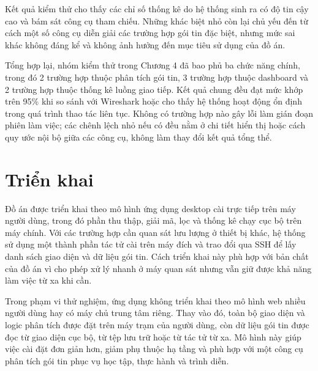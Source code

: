 \documentclass[../DoAn.tex]{subfiles}
\begin{document}
Kết quả kiểm thử cho thấy các chỉ số thống kê do hệ thống sinh ra có độ tin cậy cao và bám sát công cụ tham chiếu. Những khác biệt nhỏ còn lại chủ yếu đến từ cách một số công cụ diễn giải các trường hợp gói tin đặc biệt, nhưng mức sai khác không đáng kể và không ảnh hưởng đến mục tiêu sử dụng của đồ án.

Tổng hợp lại, nhóm kiểm thử trong Chương 4 đã bao phủ ba chức năng chính, trong đó 2 trường hợp thuộc phân tích gói tin, 3 trường hợp thuộc dashboard và 2 trường hợp thuộc thống kê luồng giao tiếp. Kết quả chung đều đạt mức khớp trên 95\% khi so sánh với Wireshark hoặc cho thấy hệ thống hoạt động ổn định trong quá trình thao tác liên tục. Không có trường hợp nào gây lỗi làm gián đoạn phiên làm việc; các chênh lệch nhỏ nếu có đều nằm ở chi tiết hiển thị hoặc cách quy ước nội bộ giữa các công cụ, không làm thay đổi kết quả tổng thể.

\section{Triển khai}
Đồ án được triển khai theo mô hình ứng dụng desktop cài trực tiếp trên máy người dùng, trong đó phần thu thập, giải mã, lọc và thống kê chạy cục bộ trên máy chính. Với các trường hợp cần quan sát lưu lượng ở thiết bị khác, hệ thống sử dụng một thành phần tác tử cài trên máy đích và trao đổi qua SSH để lấy danh sách giao diện và dữ liệu gói tin. Cách triển khai này phù hợp với bản chất của đồ án vì cho phép xử lý nhanh ở máy quan sát nhưng vẫn giữ được khả năng làm việc từ xa khi cần.

Trong phạm vi thử nghiệm, ứng dụng không triển khai theo mô hình web nhiều người dùng hay có máy chủ trung tâm riêng. Thay vào đó, toàn bộ giao diện và logic phân tích được đặt trên máy trạm của người dùng, còn dữ liệu gói tin được đọc từ giao diện cục bộ, từ tệp lưu trữ hoặc từ tác tử từ xa. Mô hình này giúp việc cài đặt đơn giản hơn, giảm phụ thuộc hạ tầng và phù hợp với một công cụ phân tích gói tin phục vụ học tập, thực hành và trình diễn.
\end{document}
